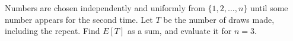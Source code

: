 Numbers are chosen independently and uniformly from $\{1,2,\dots,n\}$ until some number appears for the second time. Let $T$ be the number of draws made, including the repeat. Find $E[T]$ as a sum, and evaluate it for $n=3$.
